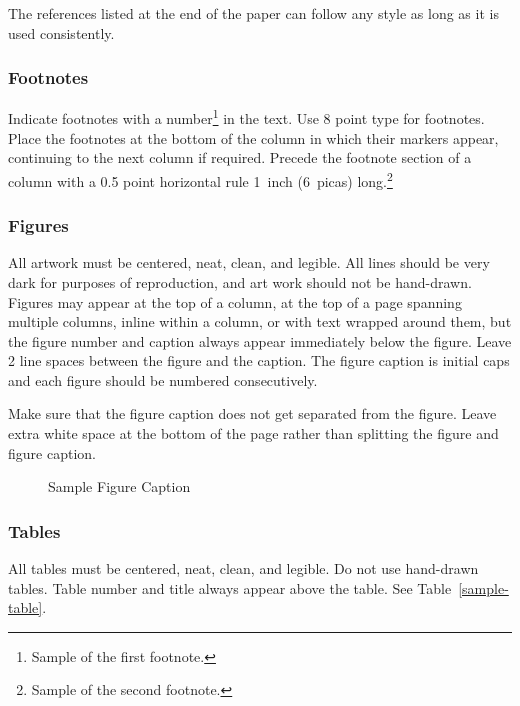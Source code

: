\documentclass[twoside]{article}
\begin{document}
The references listed at the end of the paper can follow any style as long as it is used consistently.


\subsubsection{Footnotes}

Indicate footnotes with a number\footnote{Sample of the first
  footnote.} in the text. Use 8 point type for footnotes. Place the
footnotes at the bottom of the column in which their markers appear,
continuing to the next column if required. Precede the footnote
section of a column with a 0.5 point horizontal rule 1~inch (6~picas)
long.\footnote{Sample of the second footnote.}

\subsubsection{Figures}

All artwork must be centered, neat, clean, and legible.  All lines
should be very dark for purposes of reproduction, and art work should
not be hand-drawn.  Figures may appear at the top of a column, at the
top of a page spanning multiple columns, inline within a column, or
with text wrapped around them, but the figure number and caption
always appear immediately below the figure.  Leave 2 line spaces
between the figure and the caption. The figure caption is initial caps
and each figure should be numbered consecutively.

Make sure that the figure caption does not get separated from the
figure. Leave extra white space at the bottom of the page rather than
splitting the figure and figure caption.
\begin{figure}[h]
\vspace{.3in}
\centerline{}
\vspace{.3in}
\caption{Sample Figure Caption}
\end{figure}

\subsubsection{Tables}

All tables must be centered, neat, clean, and legible. Do not use hand-drawn tables.
Table number and title always appear above the table.
See Table~\ref{sample-table}.
\end{document}
